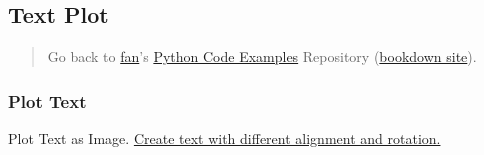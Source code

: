 \documentclass[
]{book}
\begin{document}
\hypertarget{text-plot}{%
\subsection{Text Plot}\label{text-plot}}

\begin{quote}
Go back to \href{http://fanwangecon.github.io/}{fan}'s \href{https://fanwangecon.github.io/pyfan/}{Python Code Examples} Repository (\href{https://fanwangecon.github.io/pyfan/bookdown}{bookdown site}).
\end{quote}

\hypertarget{plot-text}{%
\subsubsection{Plot Text}\label{plot-text}}

Plot Text as Image. \href{https://matplotlib.org/3.1.1/gallery/pyplots/text_layout.html\#sphx-glr-gallery-pyplots-text-layout-py}{Create text with different alignment and rotation.}
\end{document}
